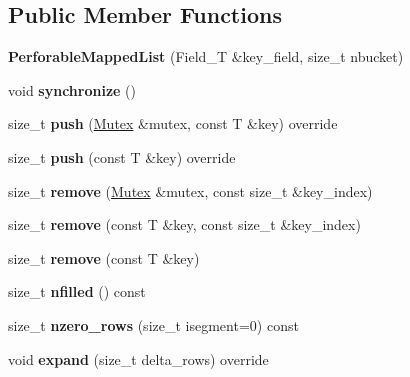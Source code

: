 \subsection*{Public Member Functions}
\begin{DoxyCompactItemize}
\item 
{\bfseries Perforable\+Mapped\+List} (Field\+\_\+T \&key\+\_\+field, size\+\_\+t nbucket)\hypertarget{classPerforableMappedList_a2762d4a481b3e97c588535f0ee90f2f6}{}\label{classPerforableMappedList_a2762d4a481b3e97c588535f0ee90f2f6}

\item 
void {\bfseries synchronize} ()\hypertarget{classPerforableMappedList_afd829a31883c89c933c087f2aedd8e76}{}\label{classPerforableMappedList_afd829a31883c89c933c087f2aedd8e76}

\item 
size\+\_\+t {\bfseries push} (\hyperlink{classMutex}{Mutex} \&mutex, const T \&key) override\hypertarget{classPerforableMappedList_a3ad479d83d73c27167e86c49bda6e097}{}\label{classPerforableMappedList_a3ad479d83d73c27167e86c49bda6e097}

\item 
size\+\_\+t {\bfseries push} (const T \&key) override\hypertarget{classPerforableMappedList_a239248b109653d69e7674783f3ab7088}{}\label{classPerforableMappedList_a239248b109653d69e7674783f3ab7088}

\item 
size\+\_\+t {\bfseries remove} (\hyperlink{classMutex}{Mutex} \&mutex, const size\+\_\+t \&key\+\_\+index)\hypertarget{classPerforableMappedList_a59fe65c19b2e25b8952e7251f8d53933}{}\label{classPerforableMappedList_a59fe65c19b2e25b8952e7251f8d53933}

\item 
size\+\_\+t {\bfseries remove} (const T \&key, const size\+\_\+t \&key\+\_\+index)\hypertarget{classPerforableMappedList_a7c11ca2e3696844922055720e4fbb51a}{}\label{classPerforableMappedList_a7c11ca2e3696844922055720e4fbb51a}

\item 
size\+\_\+t {\bfseries remove} (const T \&key)\hypertarget{classPerforableMappedList_a2c172ea8105428b57e61e2f1c4a2d53d}{}\label{classPerforableMappedList_a2c172ea8105428b57e61e2f1c4a2d53d}

\item 
size\+\_\+t {\bfseries nfilled} () const \hypertarget{classPerforableMappedList_a1050b6c3dc74100a9cf473776f8553f8}{}\label{classPerforableMappedList_a1050b6c3dc74100a9cf473776f8553f8}

\item 
size\+\_\+t {\bfseries nzero\+\_\+rows} (size\+\_\+t isegment=0) const \hypertarget{classPerforableMappedList_ac3ca6ee6cdd72ec6cf4ee159b26b00a2}{}\label{classPerforableMappedList_ac3ca6ee6cdd72ec6cf4ee159b26b00a2}

\item 
void {\bfseries expand} (size\+\_\+t delta\+\_\+rows) override\hypertarget{classPerforableMappedList_add2df1139be38db9b8f84658d8049504}{}\label{classPerforableMappedList_add2df1139be38db9b8f84658d8049504}

\end{DoxyCompactItemize}
